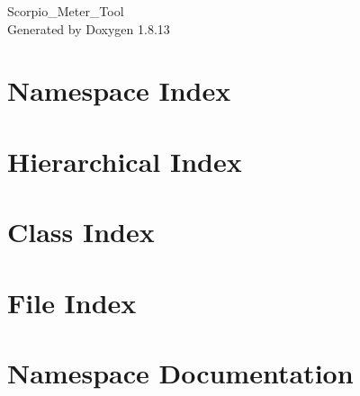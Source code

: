 \documentclass[twoside]{book}
\newcommand{\+}{\discretionary{\mbox{\scriptsize$\hookleftarrow$}}{}{}}
\newcommand{\clearemptydoublepage}{%
  \newpage{\pagestyle{empty}\cleardoublepage}%
}
\begin{document}
\hypersetup{pageanchor=false,
             bookmarksnumbered=true,
             pdfencoding=unicode
            }
\begin{titlepage}
\vspace*{7cm}
\begin{center}%
{\Large Scorpio\+\_\+\+Meter\+\_\+\+Tool }\\
\vspace*{1cm}
{\large Generated by Doxygen 1.8.13}\\
\end{center}
\end{titlepage}
\clearemptydoublepage
{}
\tableofcontents
\clearemptydoublepage
{}
\hypersetup{pageanchor=true}

\chapter{Namespace Index}

\chapter{Hierarchical Index}

\chapter{Class Index}

\chapter{File Index}

\chapter{Namespace Documentation}












\end{document}
